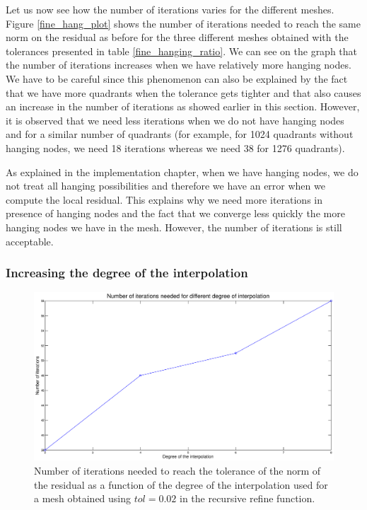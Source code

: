 Let us now see how the number of iterations varies for the different meshes. Figure \ref{fine_hang_plot} shows the number of iterations needed to reach the same norm on the residual as before for the three different meshes obtained with the tolerances presented in table \ref{fine_hanging_ratio}. We can see on the graph that the number of iterations increases when we have relatively more hanging nodes. We have to be careful since this phenomenon can also be explained by the fact that we have more quadrants when the tolerance gets tighter and that also causes an increase in the number of iterations as showed earlier in this section. However, it is observed that we need less iterations when we do not have hanging nodes and for a similar number of quadrants (for example, for 1024 quadrants without hanging nodes, we need 18 iterations whereas we need 38 for 1276 quadrants). 


As explained in the implementation chapter, when we have hanging nodes, we do not treat all hanging possibilities and therefore we have an error when we compute the local residual. This explains why we need more iterations in presence of hanging nodes and the fact that we converge less quickly the more hanging nodes we have in the mesh. However, the number of iterations is still acceptable.

\subsubsection{Increasing the degree of the interpolation} 

\begin{figure}
\centering
\includegraphics[scale=0.35]{Results/fine_hang_deg.eps}
\caption{Number of iterations needed to reach the tolerance of the norm of the residual as a function of the degree of the interpolation used for a mesh obtained using $tol=0.02$ in the recursive refine function.}
\label{fine_hang_deg}
\end{figure}

